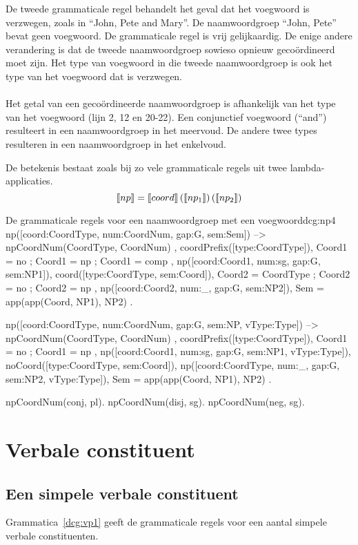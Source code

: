 De tweede grammaticale regel behandelt het geval dat het voegwoord is verzwegen, zoals in ``John, Pete and Mary''. De naamwoordgroep ``John, Pete'' bevat geen voegwoord. De grammaticale regel is vrij gelijkaardig. De enige andere verandering is dat de tweede naamwoordgroep sowieso opnieuw gecoördineerd moet zijn. Het type van voegwoord in die tweede naamwoordgroep is ook het type van het voegwoord dat is verzwegen.

\paragraph{} Het getal van een gecoördineerde naamwoordgroep is afhankelijk van het type van het voegwoord (lijn 2, 12 en 20-22). Een conjunctief voegwoord (``and'') resulteert in een naamwoordgroep in het meervoud. De andere twee types resulteren in een naamwoordgroep in het enkelvoud.

De betekenis bestaat zoals bij zo vele grammaticale regels uit twee lambda-applicaties. $$\llbracket np\rrbracket = \llbracket coord\rrbracket \left( \llbracket np_1\rrbracket \right) \left( \llbracket np_2\rrbracket \right)$$

\begin{dcg}{De grammaticale regels voor een naamwoordgroep met een voegwoord}{dcg:np4}
np([coord:CoordType, num:CoordNum, gap:G, sem:Sem]) -->
  { npCoordNum(CoordType, CoordNum) },
  coordPrefix([type:CoordType]),
  { Coord1 = no ; Coord1 = np ; Coord1 = comp },
  np([coord:Coord1, num:sg, gap:G, sem:NP1]),
  coord([type:CoordType, sem:Coord]),
  { Coord2 = CoordType ; Coord2 = no ; Coord2 = np },
  np([coord:Coord2, num:_, gap:G, sem:NP2]),
  { Sem = app(app(Coord, NP1), NP2) }.

np([coord:CoordType, num:CoordNum, gap:G, sem:NP, vType:Type]) -->
  { npCoordNum(CoordType, CoordNum) },
  coordPrefix([type:CoordType]),
  { Coord1 = no ; Coord1 = np },
  np([coord:Coord1, num:sg, gap:G, sem:NP1, vType:Type]),
  noCoord([type:CoordType, sem:Coord]),
  np([coord:CoordType, num:_, gap:G, sem:NP2, vType:Type]),
  { Sem = app(app(Coord, NP1), NP2) }.

npCoordNum(conj, pl).
npCoordNum(disj, sg).
npCoordNum(neg, sg).
\end{dcg}

\section{Verbale constituent}
\subsection{Een simpele verbale constituent}
Grammatica~\ref{dcg:vp1} geeft de grammaticale regels voor een aantal simpele verbale constituenten.

